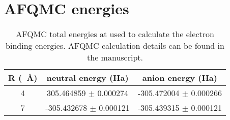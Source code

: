 \section{AFQMC energies}
\begin{table}[H]
    \centering
    \caption{AFQMC total energies at used to calculate the electron binding energies. AFQMC calculation details can be found in the manuscript.}
\begin{tabular}[H]{ccc}
    R (\SI{}{\angstrom}) & neutral energy (Ha)     & anion energy (Ha) \\ \hline
    4     & 305.464859 $\pm$ 0.000274 & -305.472004 $\pm$ 0.000266 \\
    7     & -305.432678 $\pm$ 0.000121  &  -305.439315 $\pm$ 0.000121 \\ 
\end{tabular}
\end{table}
\newpage
